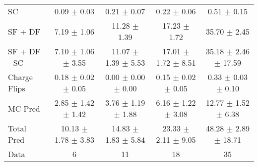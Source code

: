 \begin{tabular}{l|cccc}
                                 SC &  0.09 $\pm$  0.03 &  0.21 $\pm$  0.07 &  0.22 $\pm$  0.06 &  0.51 $\pm$  0.15 \\
                            SF + DF &  7.19 $\pm$  1.06 & 11.28 $\pm$  1.39 & 17.23 $\pm$  1.72 & 35.70 $\pm$  2.45 \\
\hline
                       SF + DF - SC &  7.10 $\pm$  1.06 $\pm$  3.55 & 11.07 $\pm$  1.39 $\pm$  5.53 & 17.01 $\pm$  1.72 $\pm$  8.51 & 35.18 $\pm$  2.46 $\pm$ 17.59 \\
\hline\hline
                       Charge Flips &  0.18 $\pm$  0.02 $\pm$  0.05 &  0.00 $\pm$  0.00 $\pm$  0.00 &  0.15 $\pm$  0.02 $\pm$  0.05 &  0.33 $\pm$  0.03 $\pm$  0.10 \\
\hline
                            MC Pred &  2.85 $\pm$  1.42 $\pm$  1.42 &  3.76 $\pm$  1.19 $\pm$  1.88 &  6.16 $\pm$  1.22 $\pm$  3.08 & 12.77 $\pm$  1.52 $\pm$  6.38 \\
\hline
                         Total Pred & 10.13 $\pm$  1.78 $\pm$  3.83 & 14.83 $\pm$  1.83 $\pm$  5.84 & 23.33 $\pm$  2.11 $\pm$  9.05 & 48.28 $\pm$  2.89 $\pm$ 18.71 \\
\hline\hline
                               Data &     6 &    11 &    18 &    35 \\
\hline\hline
\end{tabular}

